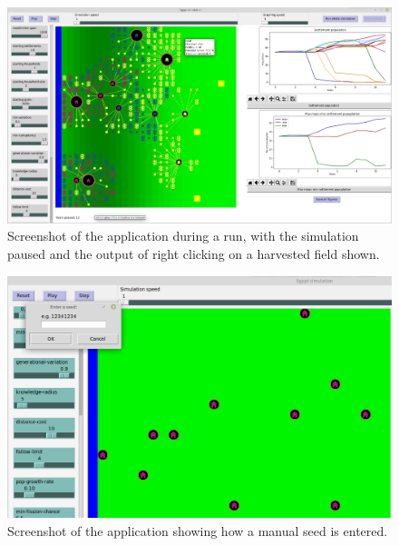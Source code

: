 \documentclass[12pt]{article}
\begin{document}
	\begin{figure}[!htb]
		\includegraphics[width=15cm]{RightClickOnHarvestedField}
		\caption{Screenshot of the application during a run, with the simulation paused and the output of right clicking on a harvested field shown.}
		\label{fig:ClickOnHarvested}
	\end{figure}
	
	\begin{figure}[!htb]
		\includegraphics[width=15cm]{SeedEntry}
		\caption{Screenshot of the application showing how a manual seed is entered.}
		\label{fig:Seed Entry}
	\end{figure}
\end{document}
